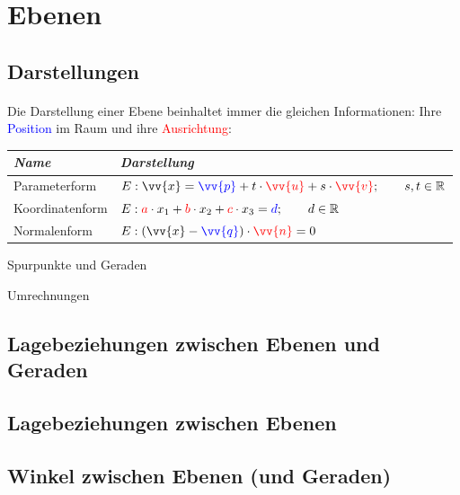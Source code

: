 \section{Ebenen}

    \subsection{Darstellungen}

        \paragraph{} Die Darstellung einer Ebene beinhaltet immer die gleichen Informationen: Ihre \textcolor{blue}{Position} im Raum und ihre
        \textcolor{red}{Ausrichtung}:\\
        \begin{center}
            \begin{tabular}{@{} *2l @{}}
                \emph{Name} & \emph{Darstellung}   \\\midrule
                Parameterform \qquad \qquad \qquad \qquad \qquad & $E:\vv{x}=\textcolor{blue}{\vv{p}} + t\cdot \textcolor{red}{\vv{u}} + s\cdot \textcolor{red}{\vv{v}} ; \qquad s,t \in \R $    \\
                Koordinatenform \qquad \qquad \qquad \qquad \qquad & $E: \textcolor{red}{a} \cdot x_{1} + \textcolor{red}{b} \cdot x_{2} + \textcolor{red}{c} \cdot x_{3} = \textcolor{blue}{d} ; \qquad d \in \mathbb{R} $ \\
                Normalenform \qquad \qquad \qquad \qquad \qquad & $E:(\vv{x} - \textcolor{blue}{\vv{q}}) \cdot \textcolor{red}{\vv{n}} = 0 $\\
            \end{tabular}
        \end{center}

    Spurpunkte und Geraden

    Umrechnungen

    \subsection{Lagebeziehungen zwischen Ebenen und Geraden}

    \subsection{Lagebeziehungen zwischen Ebenen}

    \subsection{Winkel zwischen Ebenen (und Geraden)}

